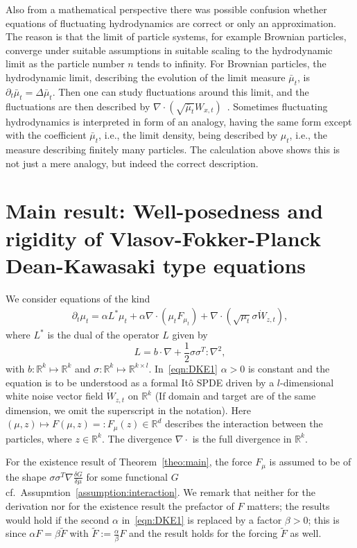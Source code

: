 \documentclass{article}
\newcommand{\R}{\mathbb{R}}
\newcommand{\F}{F}
\begin{document}
Also from a mathematical perspective there was possible confusion whether equations of fluctuating
hydrodynamics are correct or only an approximation. The reason is that the limit of particle systems, for
example Brownian particles, converge under suitable assumptions in suitable scaling to the hydrodynamic limit
as the particle number $n$ tends to infinity. For Brownian particles, the hydrodynamic limit, describing the
evolution of the limit measure $\bar\mu_t$, is $\partial_t \bar\mu_t = \Delta \bar\mu_t$. Then one can study
fluctuations around this limit, and the fluctuations are then described by
$\nabla \cdot\left(\sqrt{\bar\mu_t} W_{x,t}\right)$~\cite[Chapter~11]{Kipnis1999a}. Sometimes fluctuating
hydrodynamics is interpreted in form of an analogy, having the same form except with the coefficient
$\bar\mu_t$, i.e., the limit density, being described by $\mu_t$, i.e., the measure describing finitely many
particles. The calculation above shows this is not just a mere analogy, but indeed the correct description.

\bigskip 

\section{ Main result: Well-posedness and rigidity of Vlasov-Fokker-Planck Dean-Kawasaki type equations} 

We consider equations of the kind
\begin{align}
    \partial_t \mu_t = \alpha L^* \mu_t + \alpha \nabla \cdot(\mu_t \F
    _{\mu_t}) +  \nabla \cdot(\sqrt{\mu_t} \sigma \dot{W}_{z,t}), \label{eqn:DKE1}
\end{align}
where  $L^*$ is the dual of the operator $L$ given by
\begin{equation}
  \label{eq:L}
  L = b \cdot \nabla + \frac{1}{2}\sigma \sigma^T :\nabla^2, 
\end{equation}
with $b\colon\R^k \mapsto \R^k$ and $\sigma\colon \R^k \mapsto \R^{k\times l}$. In~\eqref{eqn:DKE1}
$\alpha >0$ is constant and the equation is to be understood as a formal It\^o SPDE driven by a
$l$-dimensional white noise vector field $\dot W_{z,t}$ on $\R^k$ (If domain and target are of the same
dimension, we omit the superscript in the notation). Here $(\mu,z) \mapsto \F(\mu,z) =: F_\mu(z)\in \R^d$
describes the interaction between the particles, where $z \in \R^k$. The divergence $\nabla\cdot$ is the full
divergence in $\R^k$.
 
For the existence result of Theorem~\ref{theo:main}, the force $F_\mu$ is assumed to be of the shape
$\sigma \sigma^T\nabla \frac{\delta G}{\delta \mu}$ for some functional $G$ cf.\
Assupmtion~\ref{assumption:interaction}. We remark that neither for the derivation nor for the existence
result the prefactor of $F$ matters; the results would hold if the second $\alpha$ in~\eqref{eqn:DKE1} is
replaced by a factor $\beta>0$; this is since $\alpha F = \beta \tilde F$ with
$\tilde F := \frac \alpha \beta F$ and the result holds for the forcing $\tilde F$ as well.
\end{document}
